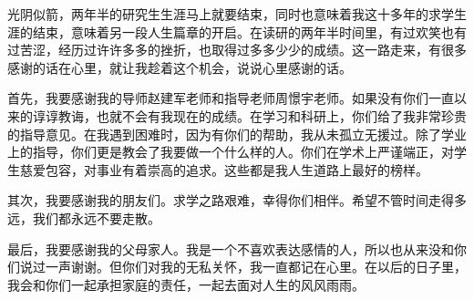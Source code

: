 
\begin{thanks}
光阴似箭，两年半的研究生生涯马上就要结束，同时也意味着我这十多年的求学生涯的结束，意味着另一段人生篇章的开启。在读研的两年半时间里，有过欢笑也有过苦涩，经历过许许多多的挫折，也取得过多多少少的成绩。这一路走来，有很多感谢的话在心里，就让我趁着这个机会，说说心里感谢的话。

首先，我要感谢我的导师赵建军老师和指导老师周憬宇老师。如果没有你们一直以来的谆谆教诲，也就不会有我现在的成绩。在学习和科研上，你们给了我非常珍贵的指导意见。在我遇到困难时，因为有你们的帮助，我从未孤立无援过。除了学业上的指导，你们更是教会了我要做一个什么样的人。你们在学术上严谨端正，对学生慈爱包容，对事业有着崇高的追求。这些都是我人生道路上最好的榜样。

其次，我要感谢我的朋友们。求学之路艰难，幸得你们相伴。希望不管时间走得多远，我们都永远不要走散。

最后，我要感谢我的父母家人。我是一个不喜欢表达感情的人，所以也从来没和你们说过一声谢谢。但你们对我的无私关怀，我一直都记在心里。在以后的日子里，我会和你们一起承担家庭的责任，一起去面对人生的风风雨雨。

\end{thanks}
